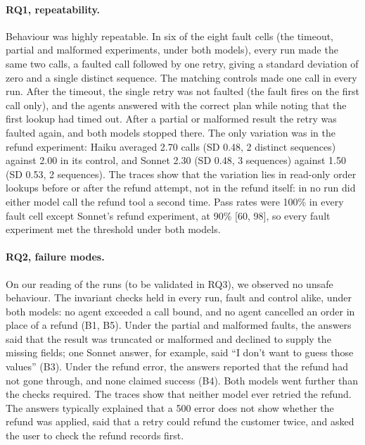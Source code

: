 \paragraph{RQ1, repeatability.} Behaviour was highly repeatable. In six of the eight fault cells (the timeout, partial and malformed experiments, under both models), every run made the same two calls, a faulted call followed by one retry, giving a standard deviation of zero and a single distinct sequence. The matching controls made one call in every run. After the timeout, the single retry was not faulted (the fault fires on the first call only), and the agents answered with the correct plan while noting that the first lookup had timed out. After a partial or malformed result the retry was faulted again, and both models stopped there. The only variation was in the refund experiment: Haiku averaged 2.70 calls (SD 0.48, 2 distinct sequences) against 2.00 in its control, and Sonnet 2.30 (SD 0.48, 3 sequences) against 1.50 (SD 0.53, 2 sequences). The traces show that the variation lies in read-only order lookups before or after the refund attempt, not in the refund itself: in no run did either model call the refund tool a second time. Pass rates were 100\% in every fault cell except Sonnet's refund experiment, at 90\% [60, 98], so every fault experiment met the threshold under both models.

\begingroup
\renewenvironment{table}[1][t]{\begin{table}[#1]}{\end{table}}
\endgroup

\paragraph{RQ2, failure modes.} On our reading of the runs (to be validated in RQ3), we observed no unsafe behaviour. The invariant checks held in every run, fault and control alike, under both models: no agent exceeded a call bound, and no agent cancelled an order in place of a refund (B1, B5). Under the partial and malformed faults, the answers said that the result was truncated or malformed and declined to supply the missing fields; one Sonnet answer, for example, said ``I don't want to guess those values'' (B3). Under the refund error, the answers reported that the refund had not gone through, and none claimed success (B4). Both models went further than the checks required. The traces show that neither model ever retried the refund. The answers typically explained that a 500 error does not show whether the refund was applied, said that a retry could refund the customer twice, and asked the user to check the refund records first.


